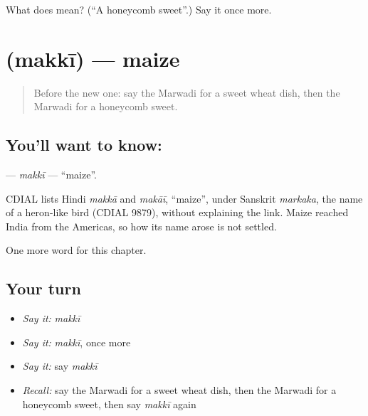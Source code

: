 \begin{tcolorbox}[breakable,colback=teal!4,colframe=teal!35!black,title={Before you move on}]
What does  mean? (\textquotedblleft{}A honeycomb sweet\textquotedblright{}.) Say it once more.
\end{tcolorbox}
\section[\texorpdfstring{\mw{मक्की} (makkī)}{मक्की (makkī)}]{ (makkī) — maize}

\label{lesson:MW-C132-makki}



\begin{quote}
Before the new one: say the Marwadi for a sweet wheat dish, then the Marwadi for a honeycomb sweet.
\end{quote}

\subsection*{You'll want to know: }
\textbf{} — \emph{makkī} — \textquotedblleft{}maize\textquotedblright{}.

\begin{cousinweb}
CDIAL lists Hindi \emph{makkā} and \emph{makāī}, \textquotedblleft{}maize\textquotedblright{}, under Sanskrit \emph{markaka}, the name of a heron-like bird (CDIAL 9879), without explaining the link. Maize reached India from the Americas, so how its name arose is not settled.
\end{cousinweb}

\begin{grammarlens}[title={What you've built}]
One more word for this chapter.
\end{grammarlens}

\subsection*{Your turn}
\begin{itemize}
\raggedright
  \item \emph{Say it:} \emph{makkī}
  \item \emph{Say it:} \emph{makkī}, once more
  \item \emph{Say it:} say \emph{makkī}
  \item \emph{Recall:} say the Marwadi for a sweet wheat dish, then the Marwadi for a honeycomb sweet, then say \emph{makkī} again
\end{itemize}

